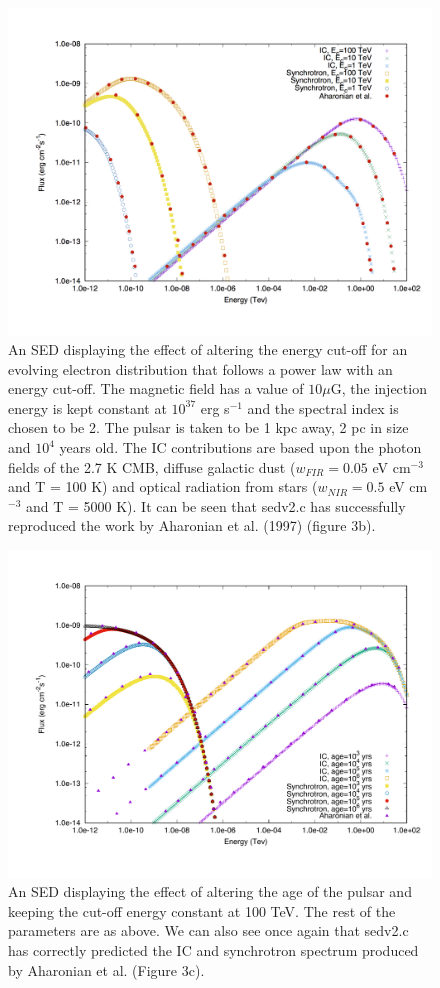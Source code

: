 \documentclass[12pt,a4paper]{article}
\begin{document}
\begin{appendices}
\begin{figure}[H]
		\label{fig:powerlawsbroken}
	\end{figure}
	\begin{figure}[H]
		\centering
		\includegraphics[width=0.52\linewidth, height=0.4\textheight, angle=-90]{kifunefig3b}
		\caption{An SED displaying the effect of altering the energy cut-off for an evolving electron distribution that follows a power law with an energy cut-off. The magnetic field has a value of $10 \mu$G, the injection energy is kept constant at $10^{37}$ erg s$^{-1}$ and the spectral index is chosen to be 2. The pulsar is taken to be 1 kpc away, 2 pc in size and $10^4$ years old. The IC contributions are based upon the photon fields of the 2.7 K CMB, diffuse galactic dust ($w_{FIR} = 0.05$ eV cm$^{-3}$ and T = 100 K) and optical radiation from stars ($w_{NIR} = 0.5$ eV cm$^{-3}$ and T = 5000 K). It can be seen that sedv2.c has successfully reproduced the work by Aharonian et al. (1997) (figure 3b).}
		\label{fig:kifunefig3b}
	\end{figure}
	 
	\begin{figure}[H]
		\centering
		\includegraphics[width=0.52\linewidth, height=0.4\textheight, angle=-90]{kifunefig3c}
		\caption{An SED displaying the effect of altering the age of the pulsar and keeping the cut-off energy constant at 100 TeV. The rest of the parameters are as above. We can also see once again that sedv2.c has correctly predicted the IC and synchrotron spectrum produced by Aharonian et al. (Figure 3c).}
		\label{fig:kifunefig3c}
	\end{figure}




\end{appendices}
\end{document}

